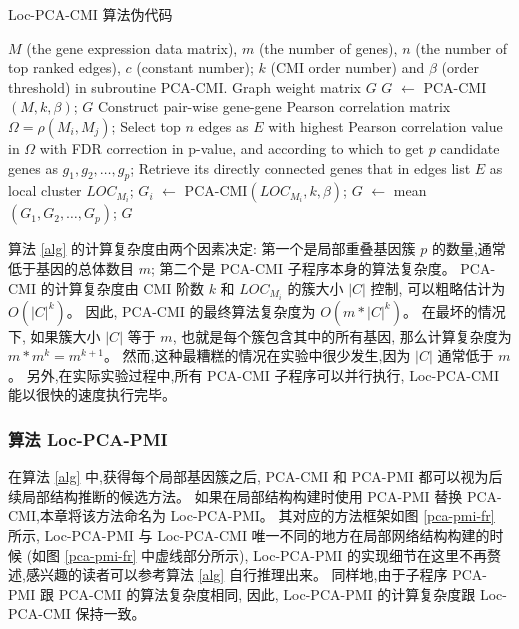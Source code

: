\begin{algorithm}[!htbp]
    \caption{Loc-PCA-CMI 算法伪代码}
    \label{alg}
    \begin{algorithmic}[1]
    \Require $M$ (the gene expression data matrix), $m$ (the number of genes), $n$ (the number of top ranked edges), $c$ (constant number); $k$ (CMI order number) and $\beta$ (order threshold) in subroutine PCA-CMI.
    \Ensure Graph weight matrix $G$ 
    \State $G$ $\leftarrow$ PCA-CMI$(M, k, \beta)$;
    \State \Return $G$
    \Else
    \State Construct pair-wise gene-gene Pearson correlation matrix $\Omega = \rho(M_i, M_j)$;
    \State Select top $n$ edges as $E$ with highest Pearson correlation value in $\Omega$ with FDR correction in p-value, and according to which to get 
    $p$ candidate genes as $g_1,g_2,\ldots,g_{p}$;
      \State Retrieve its directly connected genes that in edges list $E$ as local cluster $LOC_{M_i}$;
    \EndFor
      \State $G_{i}$ $\leftarrow$ PCA-CMI$(LOC_{M_i}, k, \beta)$;
    \EndFor
    \State $G$ $\leftarrow$ mean$(G_{1},G_{2},\ldots,G_{p})$;
    \State \Return $G$ 
    \EndIf
    \end{algorithmic}
\end{algorithm}

算法 \ref{alg} 的计算复杂度由两个因素决定:
 第一个是局部重叠基因簇 $p$ 的数量,通常低于基因的总体数目 $m$; 
第二个是 PCA-CMI 子程序本身的算法复杂度。
 PCA-CMI 的计算复杂度由 CMI 阶数 $k$ 和 $LOC_{M_i}$ 的簇大小 $|C|$ 控制,
可以粗略估计为 $O(|C|^k)$。
因此, PCA-CMI 的最终算法复杂度为 $O(m *|C|^k)$。
在最坏的情况下, 如果簇大小 $|C|$ 等于 $m$, 也就是每个簇包含其中的所有基因, 
那么计算复杂度为 $m*m^k = m^{k+1}$。 
然而,这种最糟糕的情况在实验中很少发生,因为 $|C|$ 通常低于 $m$。
另外,在实际实验过程中,所有 PCA-CMI 子程序可以并行执行, Loc-PCA-CMI 能以很快的速度执行完毕。

\subsubsection{算法 Loc-PCA-PMI }

在算法 \ref{alg} 中,获得每个局部基因簇之后,
 PCA-CMI 和 PCA-PMI 都可以视为后续局部结构推断的候选方法。
如果在局部结构构建时使用 PCA-PMI 替换 PCA-CMI,本章将该方法命名为 Loc-PCA-PMI。
其对应的方法框架如图 \ref{pca-pmi-fr} 所示, 
 Loc-PCA-PMI 与 Loc-PCA-CMI 唯一不同的地方在局部网络结构构建的时候 (如图 \ref{pca-pmi-fr} 中虚线部分所示),
 Loc-PCA-PMI 的实现细节在这里不再赘述,感兴趣的读者可以参考算法 \ref{alg} 自行推理出来。
同样地,由于子程序 PCA-PMI 跟 PCA-CMI 的算法复杂度相同,
因此, Loc-PCA-PMI 的计算复杂度跟 Loc-PCA-CMI 保持一致。

